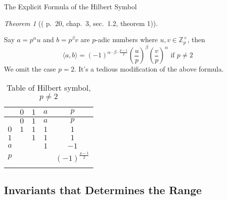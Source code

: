 \documentclass[fontset=fandol,envcountsect]{ctexbeamer}
\theoremstyle{theorem}
\newtheorem{theorem}{定理}
\theoremstyle{example}
\theoremstyle{remark}
\theoremstyle{theorem}
\newtheorem{theorem}{Theorem}
\theoremstyle{example}
\theoremstyle{remark}
\begin{document}
\begin{frame}{The Explicit Formula of the Hilbert Symbol}
\label{the-explicit-formula-of-the-hilbert-symbol}
\begin{theorem}[(\autocite{serre_course_1973} p.~20, chap.~3, sec.~1.2,
theorem
1)]\protect\hypertarget{thm-hilbert-symbol}{}\label{thm-hilbert-symbol}

Say \(a = p^\alpha u\) and \(b = p^\beta v\) are \(p\)-adic numbers
where \(u,v \in \mathbb Z_p^\times\), then \[
\langle a, b \rangle = (-1)^{\alpha \cdot \beta \cdot \frac{p-1}{2}} \left(\dfrac{u}{p}\right)^\beta \left(\dfrac{v}{p}\right)^\alpha \text{ if } p \neq 2
\] We omit the case \(p=2\). It's a tedious modification of the above
formula.

\end{theorem}

\begin{longtable}[]{@{}lcccc@{}}
\toprule\noalign{}
& \(0\) & \(1\) & \(a\) & \(p\) \\
\midrule\noalign{}
\endfirsthead
\toprule\noalign{}
& \(0\) & \(1\) & \(a\) & \(p\) \\
\midrule\noalign{}
\endhead
\(0\) & \(1\) & \(1\) & \(1\) & \(1\) \\
\(1\) & & \(1\) & \(1\) & \(1\) \\
\(a\) & & & \(1\) & \(-1\) \\
\(p\) & & & & \((-1)^{\frac{p-1}{2}}\) \\
\bottomrule\noalign{}
\caption{Table of Hilbert symbol, \(p \neq 2\)}\tabularnewline
\end{longtable}
\end{frame}

\subsection{Invariants that Determines the
Range}\label{invariants-that-determines-the-range}
\end{document}
